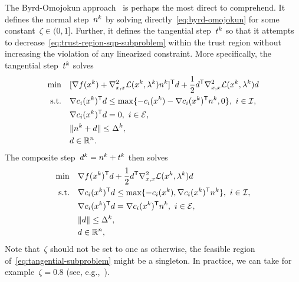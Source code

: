 The Byrd-Omojokun approach~\cite{Byrd_1987,Omojokun_1989} is perhaps the most direct to comprehend.
It defines the normal step~$\nstep[k]$ by solving directly~\cref{eq:byrd-omojokun} for some constant~$\zeta \in (0, 1]$.
Further, it defines the tangential step~$\tstep[k]$ so that it attempts to decrease~\cref{eq:trust-region-sqp-subproblem} within the trust region without increasing the violation of any linearized constraint.
More specifically, the tangential step~$\tstep[k]$ solves
\begin{subequations}
    \label{eq:tangential-subproblem}
    \begin{align}
        \min        & \quad [\nabla \obj(\iter[k]) + \nabla_{x, x}^2 \lag(\iter[k], \lm[k]) \nstep[k]]^{\T} \step + \frac{1}{2} \step^{\T} \nabla_{x, x}^2 \lag(\iter[k], \lm[k]) \step\\
        \text{s.t.} & \quad \nabla \con{i}(\iter[k])^{\T} \step \le \max \set{-\con{i}(\iter[k]) - \nabla \con{i}(\iter[k])^{\T} \nstep[k], 0}, ~ i \in \iub,\\
                    & \quad \nabla \con{i}(\iter[k])^{\T} \step = 0, ~ i \in \ieq,\\
                    & \quad \norm{\nstep[k] + \step} \le \rad[k],\\
                    & \quad \step \in \R^n.
    \end{align}
\end{subequations}
The composite step~$\step[k] = \nstep[k] + \tstep[k]$ then solves
\begin{subequations}
    \label{eq:vardi-composite-step}
    \begin{align}
        \min        & \quad \nabla \obj(\iter[k])^{\T} \step + \frac{1}{2} \step^{\T} \nabla_{x, x}^2 \lag(\iter[k], \lm[k]) \step\\
        \text{s.t.} & \quad \nabla \con{i}(\iter[k])^{\T} \step \le \max \set{-\con{i}(\iter[k]), \nabla \con{i}(\iter[k])^{\T} \nstep[k]}, ~ i \in \iub, \label{eq:vardi-composite-step-ub}\\
                    & \quad \nabla \con{i}(\iter[k])^{\T} \step = \nabla \con{i}(\iter[k])^{\T} \nstep[k], ~ i \in \ieq, \label{eq:vardi-composite-step-eq}\\
                    & \quad \norm{\step} \le \rad[k],\\
                    & \quad \step \in \R^n,
    \end{align}
\end{subequations}
Note that~$\zeta$ should not be set to one as otherwise, the feasible region of~\cref{eq:tangential-subproblem} might be a singleton.
In practice, we can take for example~$\zeta = 0.8$ (see, e.g.,~\cite[Eq.~(18.45)]{Nocedal_Wright_2006}).

